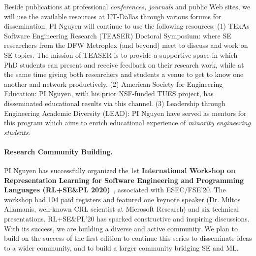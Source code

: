 Beside publications at professional \emph{conferences, journals} and
public Web sites, we will use the available resources at UT-Dallas
through various forums for dissemination.
%
PI Nguyen will continue to use the following resources: (1) TExAs
Software Engineering Research (TEASER) Doctoral Symposium: where SE
researchers from the DFW Metroplex (and beyond) meet to discuss and
work on SE topics.  The mission of TEASER is to provide a supportive
space in which PhD students can present and receive feedback on their
research work, while at the same time giving both researchers and
students a venue to get to know one another and network productively.
(2) American Society for Engineering Education: PI Nguyen, with his
prior NSF-funded TUES project, has disseminated educational results
via this channel.
(3) Leadership through Engineering Academic Diversity (LEAD): PI
Nguyen have served as mentors for this program which aims to enrich
educational experience of {\em minority engineering students}.

\paragraph{Research Community Building.}

PI Nguyen has successfully organized the 1st {\bf International
Workshop on Representation Learning for Software Engineering and
Programming Languages (RL+SE\&PL 2020)}~\cite{rlsepl}, associated with
ESEC/FSE'20. The workshop had 104 paid registers and featured one
keynote speaker (Dr. Miltos Allamanis, well-known CRL scientist at
Microsoft Research) and six technical presentations. RL+SE\&PL'20 has
sparked constructive and inspiring discussions. With its success, we
are building a diverse and active community. We plan to build on the
success of the first edition to continue this series to disseminate
ideas to a wider community, and to build a larger community bridging
SE and ML.
